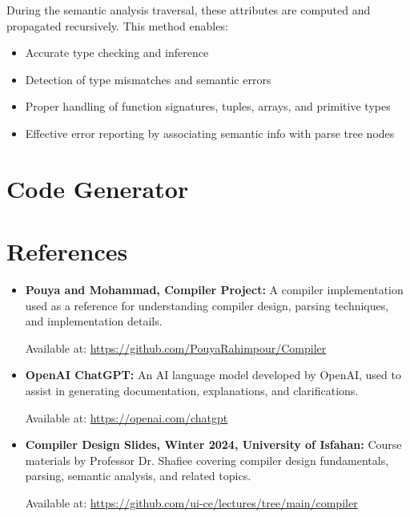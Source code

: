 \documentclass[12pt, a4paper]{report}
\begin{document}
During the semantic analysis traversal, these attributes are computed and propagated recursively. This method enables:

\begin{itemize}
    \item Accurate type checking and inference
    \item Detection of type mismatches and semantic errors
    \item Proper handling of function signatures, tuples, arrays, and primitive types
    \item Effective error reporting by associating semantic info with parse tree nodes
\end{itemize}



\chapter{Code Generator}


\chapter{References}

\begin{itemize}
    \item \textbf{Pouya and Mohammad, Compiler Project:}  
    A compiler implementation used as a reference for understanding compiler design, parsing techniques, and implementation details.  
    
    Available at: \url{https://github.com/PouyaRahimpour/Compiler}

    \item \textbf{OpenAI ChatGPT:}  
    An AI language model developed by OpenAI, used to assist in generating documentation, explanations, and clarifications.  
    
    Available at: \url{https://openai.com/chatgpt}

    \item \textbf{Compiler Design Slides, Winter 2024, University of Isfahan:}  
    Course materials by Professor Dr. Shafiee covering compiler design fundamentals, parsing, semantic analysis, and related topics.  
    
    Available at: \url{https://github.com/ui-ce/lectures/tree/main/compiler}
\end{itemize}
\end{document}
